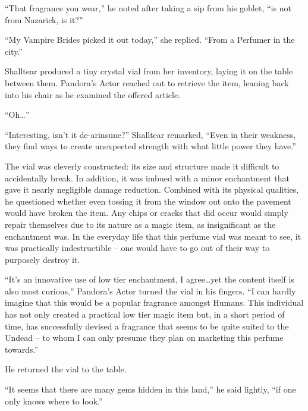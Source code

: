 

“That fragrance you wear,” he noted after taking a sip from his goblet, “is not from Nazarick, is it?”

 

“My Vampire Brides picked it out today,” she replied. “From a Perfumer in the city.”

 

Shalltear produced a tiny crystal vial from her inventory, laying it on the table between them. Pandora’s Actor reached out to retrieve the item, leaning back into his chair as he examined the offered article.

 

“Oh…”

 

“Interesting, isn’t it de-arinsune?” Shalltear remarked, “Even in their weakness, they find ways to create unexpected strength with what little power they have.”

 

The vial was cleverly constructed: its size and structure made it difficult to accidentally break. In addition, it was imbued with a minor enchantment that gave it nearly negligible damage reduction. Combined with its physical qualities, he questioned whether even tossing it from the window out onto the pavement would have broken the item. Any chips or cracks that did occur would simply repair themselves due to its nature as a magic item, as insignificant as the enchantment was. In the everyday life that this perfume vial was meant to see, it was practically indestructible – one would have to go out of their way to purposely destroy it.

 

“It’s an innovative use of low tier enchantment, I agree…yet the content itself is also most curious,” Pandora’s Actor turned the vial in his fingers. “I can hardly imagine that this would be a popular fragrance amongst Humans. This individual has not only created a practical low tier magic item but, in a short period of time, has successfully devised a fragrance that seems to be quite suited to the Undead – to whom I can only presume they plan on marketing this perfume towards.”

 

He returned the vial to the table.

 

“It seems that there are many gems hidden in this land,” he said lightly, “if one only knows where to look.”

 

